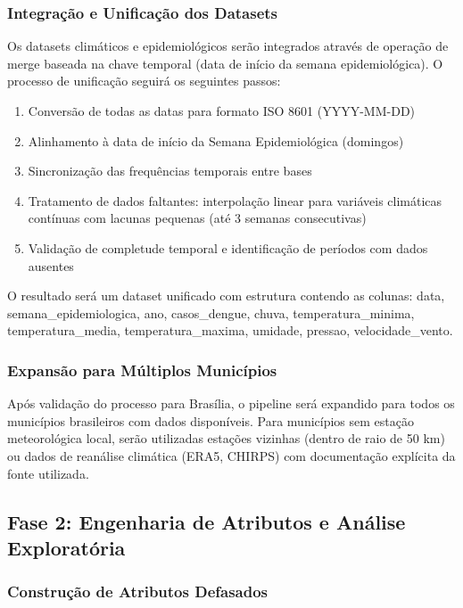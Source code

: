 \subsubsection{Integração e Unificação dos Datasets}

Os datasets climáticos e epidemiológicos serão integrados através de operação de merge baseada na chave temporal (data de início da semana epidemiológica). O processo de unificação seguirá os seguintes passos:

\begin{enumerate}
    \item Conversão de todas as datas para formato ISO 8601 (YYYY-MM-DD)
    \item Alinhamento à data de início da Semana Epidemiológica (domingos)
    \item Sincronização das frequências temporais entre bases
    \item Tratamento de dados faltantes: interpolação linear para variáveis climáticas contínuas com lacunas pequenas (até 3 semanas consecutivas)
    \item Validação de completude temporal e identificação de períodos com dados ausentes
\end{enumerate}

O resultado será um dataset unificado com estrutura contendo as colunas: data, semana\_epidemiologica, ano, casos\_dengue, chuva, temperatura\_minima, temperatura\_media, temperatura\_maxima, umidade, pressao, velocidade\_vento.

\subsubsection{Expansão para Múltiplos Municípios}

Após validação do processo para Brasília, o pipeline será expandido para todos os municípios brasileiros com dados disponíveis. Para municípios sem estação meteorológica local, serão utilizadas estações vizinhas (dentro de raio de 50 km) ou dados de reanálise climática (ERA5, CHIRPS) com documentação explícita da fonte utilizada.

\subsection{Fase 2: Engenharia de Atributos e Análise Exploratória}

\subsubsection{Construção de Atributos Defasados}

